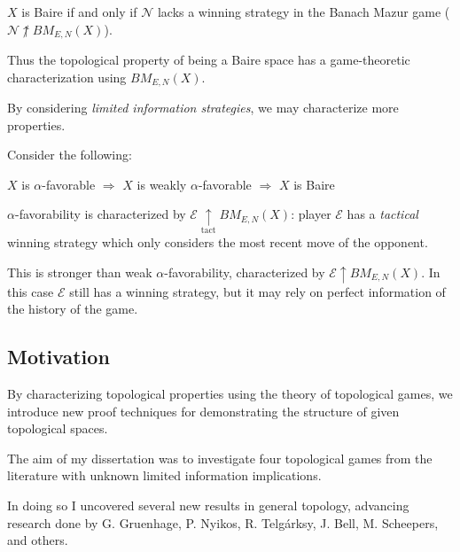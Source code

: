 \documentclass{beamer}
\theoremstyle{definition}
\newcommand{\win}{\uparrow}
\newcommand{\tactwin}{\underset{\text{tact}}{\uparrow}}
\newcommand{\<}{\langle}
\renewcommand{\>}{\rangle}
\newcommand{\pl}[1]{\mathscr{#1}}
\newcommand{\term}{\textit}
\newcommand{\bmGame}[1]{{BM}_{E,N}(#1)}
\begin{document}
\begin{frame}
  \begin{theorem}
    $X$ is Baire if and only if $\pl N$ lacks a winning strategy
    in the Banach Mazur game ($\pl N\not\win\bmGame{X}$).
  \end{theorem}

  \pause

  Thus the topological property of being a Baire space has a game-theoretic
  characterization using $\bmGame{X}$.

  \vpause

  By considering \term{limited information strategies}, we may characterize
  more properties.
\end{frame}

\begin{frame}
  Consider the following:

  \begin{theorem}
    $X$ is $\alpha$-favorable $\Rightarrow$
    $X$ is weakly $\alpha$-favorable $\Rightarrow$
    $X$ is Baire
  \end{theorem}

  \pause

  $\alpha$-favorability is characterized by $\pl E\tactwin\bmGame{X}$:
  player $\pl E$ has a \term{tactical} winning strategy which only considers
  the most recent move of the opponent.

  \vpause

  This is stronger than weak
  $\alpha$-favorability, characterized by $\pl E\win\bmGame{X}$.
  In this case $\pl E$ still has a winning strategy, but it may
  rely on perfect information of the history of the game.
\end{frame}

\subsection{Motivation}

\begin{frame}
  By characterizing topological properties using the theory of
  topological games, we introduce new proof techniques for demonstrating
  the structure of given topological spaces.

  \vpause

  The aim of my dissertation was to investigate four topological games
  from the literature with unknown limited information implications.

  \vpause

  In doing so I uncovered several new results in general topology,
  advancing research done by
  G. Gruenhage, P. Nyikos, R. Telg{\' a}rksy, J. Bell,
  M. Scheepers, and others.
\end{frame}
\end{document}
